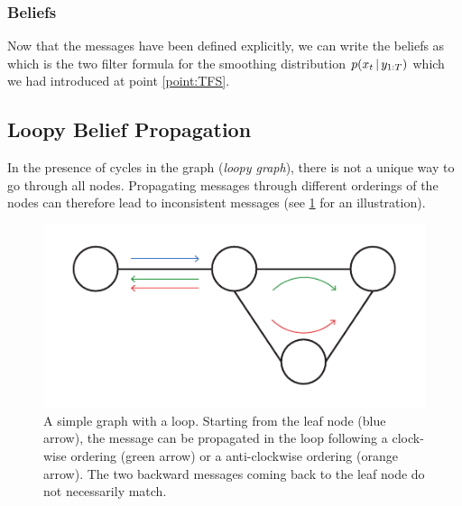 \subsubsection{Beliefs}
Now that the messages have been defined explicitly, we can write the beliefs as
%
%
which is the two filter formula for the smoothing distribution $p(x_{t}\,|\, y_{1:T})$ which we had introduced at point \ref{point:TFS}.

\subsection{\label{point:LBP}Loopy Belief Propagation}

In the presence of cycles in the graph (\emph{loopy graph}), there is not a unique way to go through all nodes. 
Propagating messages through different orderings of the nodes can therefore lead to inconsistent messages (see \ref{fig:lbp-inconsistent} for an illustration).
 
\begin{figure}[!h]
\center
\includegraphics[width=.7\textwidth]{figures/lbp/loopy1}
\caption{\label{fig:lbp-inconsistent}A simple graph with a loop. Starting from the leaf node (blue arrow), the message can be propagated in the loop following a clock-wise ordering (green arrow) or a anti-clockwise ordering (orange arrow). The two backward messages coming back to the leaf node do not necessarily match.}
\end{figure}

